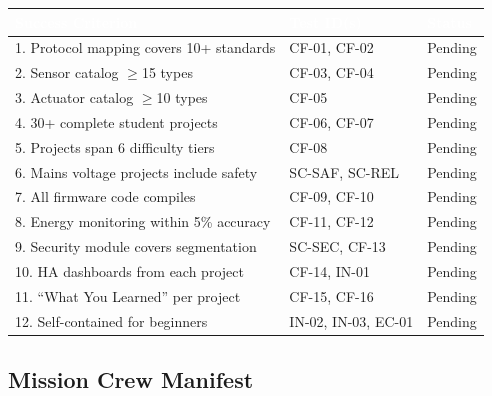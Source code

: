 \documentclass[11pt,letterpaper]{article}
\newcommand{\tableheader}[1]{\textbf{\sffamily\textcolor{white}{#1}}}
\begin{document}
\begin{center}
\begin{tabularx}{\textwidth}{XL{3cm}C{1.5cm}}
\toprule
{}
\tableheader{Success Criterion} & \tableheader{Test ID(s)} & \tableheader{Status} \\
. Protocol mapping covers 10+ standards & CF-01, CF-02 & Pending \\
2. Sensor catalog $\geq$15 types & CF-03, CF-04 & Pending \\
3. Actuator catalog $\geq$10 types & CF-05 & Pending \\
4. 30+ complete student projects & CF-06, CF-07 & Pending \\
5. Projects span 6 difficulty tiers & CF-08 & Pending \\
6. Mains voltage projects include safety & SC-SAF, SC-REL & Pending \\
7. All firmware code compiles & CF-09, CF-10 & Pending \\
8. Energy monitoring within 5\% accuracy & CF-11, CF-12 & Pending \\
9. Security module covers segmentation & SC-SEC, CF-13 & Pending \\
10. HA dashboards from each project & CF-14, IN-01 & Pending \\
11. ``What You Learned'' per project & CF-15, CF-16 & Pending \\
12. Self-contained for beginners & IN-02, IN-03, EC-01 & Pending \\
\bottomrule
\end{tabularx}
\end{center}

\subsection{Mission Crew Manifest}
\end{document}
